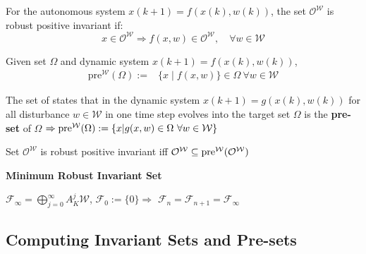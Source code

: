 \begin{definition}
  For the autonomous system
  $x(k+1)=f(x(k),w(k))$,
  the set $\mathcal{O}^\mathcal{W}$
  is robust positive invariant
  if:
  \[
    x\in\mathcal{O}^\mathcal{W}\Rightarrow
    f(x,w) \in \mathcal{O}^\mathcal{W},
    \quad \forall w \in \mathcal{W}
  \]
\end{definition}
Given set $\Omega$ and dynamic system $x(k+1) = f(x(k), w(k))$,
\begin{align*}
  \mathrm{pre}^{\mathcal{W}}(\Omega) := & \{x \mid f(x,w)\} \in
  \Omega \ \forall w \in \mathcal{W}
\end{align*}

\begin{definition}
  The set of states that
  in the dynamic system $x(k+1) = g(x(k),w(k))$
  for all disturbance $w\in\mathcal{W}$
  in one time step evolves into the target set $\Omega$
  is the \textbf{pre-set} of $\Omega$
  $\Rightarrow \operatorname{pre}^\mathcal{W}(\Omega) :=
  \{x|g(x,w)\in \Omega\ \forall w\in\mathcal{W}\}$
\end{definition}

\begin{theorem}
  Set $\mathcal{O}^\mathcal{W}$
  is robust positive invariant iff
  $\mathcal{O}^\mathcal{W} \subseteq
  \operatorname{pre}^\mathcal{W}(\mathcal{O}^\mathcal{W})$
\end{theorem}

\textbf{Minimum Robust Invariant Set}

$\mathcal{F}_\infty = \bigoplus_{j=0}^\infty A_K^j \mathcal{W}$,
$\mathcal{F}_0 := \{0\}\Rightarrow$
$\mathcal{F}_n = \mathcal{F}_{n+1} = \mathcal{F}_\infty$

\subsection{Computing Invariant Sets and Pre-sets}

